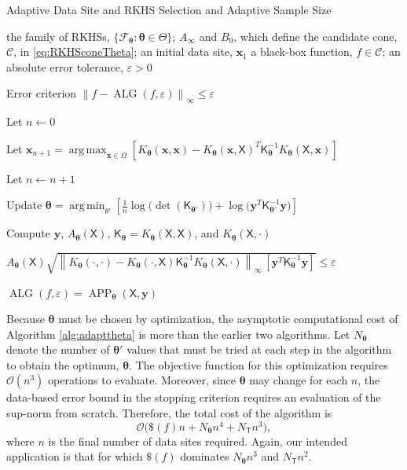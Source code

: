 \documentclass[]{mcom-l}
\theoremstyle{remark}
\DeclareMathOperator*{\argmax}{arg\,max}
\DeclareMathOperator*{\argmin}{arg\,min}
\DeclareMathOperator{\ALG}{ALG}
\DeclareMathOperator{\APP}{APP}
\newcommand{\NT}{{N_{\mT}}}
\newcommand{\Ntheta}{{N_{\btheta}}}
\newcommand{\mK}{\mathsf{K}}
\newcommand{\mT}{\mathsf{T}}
\newcommand{\mX}{\mathsf{X}}
\newcommand{\bx}{{\boldsymbol{x}}}
\newcommand{\by}{{\boldsymbol{y}}}
\newcommand{\btheta}{{\boldsymbol{\theta}}}
\newcommand{\cc}{\mathcal{C}}
\newcommand{\calf}{{\mathcal{F}}}
\newcommand{\norm}[2][{}]{\ensuremath{\left \lVert #2 \right \rVert}_{#1}}
\newcommand{\Order}{\mathcal{O}}
\begin{document}
\begin{algorithm}[H]
	\caption{Adaptive Data Site and RKHS Selection and Adaptive Sample Size \label{alg:adapttheta}}
	\begin{algorithmic}
		\PARAM the family of RKHSs, $\{\calf_{\btheta} : \btheta \in \Theta\}$; $A_\infty$ and $B_0$, which define the candidate cone, $\cc$, in \eqref{eq:RKHSconeTheta}; an initial data site, $\bx_1$
		\INPUT a black-box function, $f \in \cc$; an absolute error tolerance, $\varepsilon>0$
		
		\Ensure Error criterion $\norm[\infty]{f - \ALG(f,\varepsilon)} \le \varepsilon$
		
		\State Let $n \leftarrow 0$
		
		\Repeat
		
		
		\State Let $ \bx_{n+1} = \displaystyle \argmax_{\bx \in \Omega} [K_\btheta(\bx,\bx) - K_\btheta(\bx,\mX)^T \mK_\btheta^{-1} K_\btheta(\mX,\bx)]$
		
		\EndIf
		
		\State Let $n \leftarrow n + 1$
		
		\State Update $\displaystyle\btheta = \argmin_{\theta'}  \left[\frac 1n \log \bigl( \det(\mK_{\btheta'}) \bigr) + \log \bigl ( \by^T \mK_{\btheta'}^{-1} \by \bigr)\right]$
		
		\State Compute $\by$, $A_\btheta(\mX)$, $\mK_\btheta = K_\btheta(\mX,\mX)$, and $K_\btheta(\mX,\cdot)$
		
		\Until $A_\btheta(\mX) \sqrt{\norm[\infty]{K_\btheta(\cdot,\cdot) - K_\btheta(\cdot,\mX) \mK_\btheta^{-1} K_\btheta(\mX,\cdot)} \, [\by^T \mK_\btheta^{-1} \by] }  \le \varepsilon$
		
		\RETURN $\ALG(f,\varepsilon) = \APP_\btheta(\mX,\by)$
		
	\end{algorithmic}
\end{algorithm}

Because $\btheta$ must be chosen by optimization, the asymptotic computational cost of Algorithm \ref{alg:adapttheta} is more than the earlier two algorithms.  Let $\Ntheta$ denote the number of $\btheta'$ values that must be tried at each step in the algorithm to obtain the optimum, $\btheta$.  The objective function for this optimization requires $\Order(n^3)$ operations to evaluate.  Moreover, since $\btheta$ may change for each $n$, the data-based error bound in the stopping criterion requires an evaluation of the sup-norm from scratch.  Therefore, the total cost of the algorithm is 
\begin{equation} \label{eq:compcosttheta}
\Order\bigl(\$(f)n + \Ntheta n^4 + \NT n^3 \bigr),
\end{equation}
where $n$ is the final number of data sites required.  Again, our intended application is that for which $\$(f)$ dominates $\Ntheta n^3$ and $\NT n^2$.  
\end{document}
